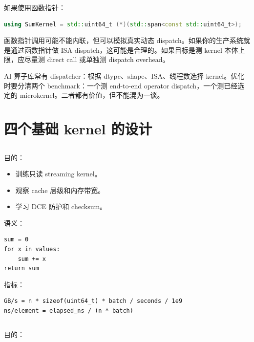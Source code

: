 如果使用函数指针：

\begin{lstlisting}[language=C++]
using SumKernel = std::uint64_t (*)(std::span<const std::uint64_t>);
\end{lstlisting}

函数指针调用可能不能内联，但可以模拟真实动态 dispatch。如果你的生产系统就是通过函数指针做 ISA dispatch，这可能是合理的。如果目标是测 kernel 本体上限，应尽量测 direct call 或单独测 dispatch overhead。

\begin{deepdive}
AI 算子库常有 dispatcher：根据 dtype、shape、ISA、线程数选择 kernel。优化时要分清两个 benchmark：一个测 end-to-end operator dispatch，一个测已经选定的 microkernel。二者都有价值，但不能混为一谈。
\end{deepdive}

\section{四个基础 kernel 的设计}

\subsection{}

目的：

\begin{itemize}
  \item 训练只读 streaming kernel。
  \item 观察 cache 层级和内存带宽。
  \item 学习 DCE 防护和 checksum。
\end{itemize}

语义：

\begin{lstlisting}
sum = 0
for x in values:
    sum += x
return sum
\end{lstlisting}

指标：

\begin{lstlisting}
GB/s = n * sizeof(uint64_t) * batch / seconds / 1e9
ns/element = elapsed_ns / (n * batch)
\end{lstlisting}

\subsection{}

目的：


